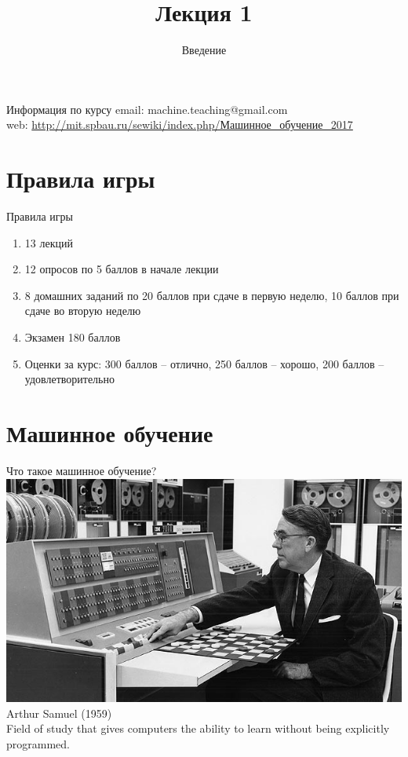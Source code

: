 \documentclass[10pt]{beamer}
\title{Лекция 1}
\subtitle{Введение}
\begin{document}
\maketitle

\begin{frame}{Информация по курсу}
  email: machine.teaching@gmail.com \\
  web: \href{http://mit.spbau.ru/sewiki/index.php/Машинное_обучение_2017}{http://mit.spbau.ru/sewiki/index.php/Машинное\_обучение\_2017}\\
\end{frame}

\section{Правила игры}

\begin{frame}{Правила игры}
  \begin{enumerate} [-]  
    \item 13 лекций
    \item 12 опросов по 5 баллов в начале лекции
    \item 8 домашних заданий по 20 баллов при сдаче в первую неделю, 10 баллов при сдаче во вторую неделю
    \item Экзамен 180 баллов
    \bigbreak
    \item Оценки за курс: \alert{300 баллов} -- отлично, \alert{250 баллов} -- хорошо, \alert{200 баллов} -- удовлетворительно
  \end{enumerate}  
\end{frame}

\section{Машинное обучение}

\begin{frame}{Что такое машинное обучение?}
  \includegraphics[width=0.5 \linewidth, height=0.5 \textheight, keepaspectratio]{images/samuel}\\
	Arthur Samuel (1959) \\
	\bigbreak
	Field of study that gives computers the ability to learn without being explicitly programmed.
\end{frame}
\end{document}
